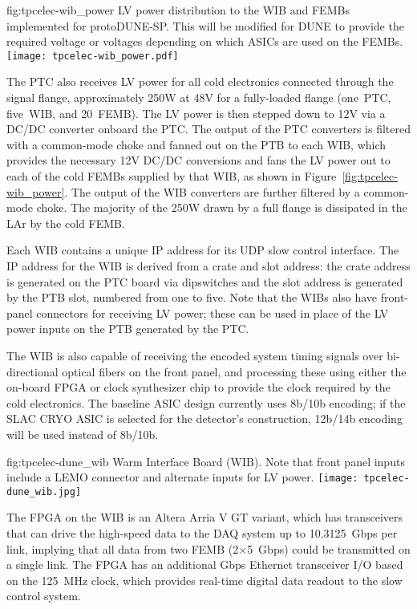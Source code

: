 \begin{dunefigure}
{fig:tpcelec-wib_power}
{LV power distribution to the WIB and FEMBs implemented for protoDUNE-SP. This will be modified for DUNE to provide the required voltage or voltages depending on which ASICs are used on the FEMBs.}
\texttt{[image: tpcelec-wib\_power.pdf]}
\end{dunefigure}

The PTC also receives LV power for all cold
electronics connected through the signal flange, approximately 250W at 48V for a
fully-loaded flange (one~PTC, five~WIB, and 20~FEMB). The LV power is then stepped down
to 12V via a DC/DC converter onboard the PTC. The output of the PTC converters is filtered with a common-mode choke and fanned out
on the PTB to each WIB, which provides the necessary 12V DC/DC conversions and fans
the LV power out to each of the cold FEMBs supplied by that WIB, 
as shown in Figure~\ref{fig:tpcelec-wib_power}. The output of the WIB converters are further filtered by a common-mode choke. The 
majority of the 250W drawn by a full flange is dissipated in the LAr
by the cold FEMB.

Each WIB contains a 
unique IP address for its UDP slow control interface. The IP address for the WIB is 
derived from a crate and slot address: the crate address is generated on the PTC 
board via dipswitches and the slot address is generated by the PTB slot, numbered 
from one to five. Note that the WIBs also have front-panel
connectors for receiving LV power; these can be used in place of 
the LV power inputs on the PTB generated by the PTC.

The WIB is also capable of
receiving the encoded system timing signals over bi-directional optical
fibers on the front panel, and processing these using either
the on-board FPGA or clock synthesizer chip to provide the clock required by the cold electronics.
The baseline ASIC design currently uses 8b/10b encoding; if the SLAC CRYO ASIC is selected for
the detector's construction, 12b/14b encoding will be used instead of 8b/10b.

\begin{dunefigure}
{fig:tpcelec-dune_wib}
{Warm Interface Board (WIB). Note that front panel inputs include a LEMO connector and alternate inputs for LV power.}
\texttt{[image: tpcelec-dune\_wib.jpg]}
\end{dunefigure}

The FPGA on the WIB is an Altera Arria V GT variant, which has
transceivers that can drive the high-speed data to the DAQ system up to
10.3125~Gbps per link, implying that all data from
two FEMB (2$\times$5~Gbps) could be transmitted on a single link.
The FPGA has an additional Gbps Ethernet transceiver I/O based on the 125~MHz clock, which 
provides real-time digital data readout to the slow control system.
